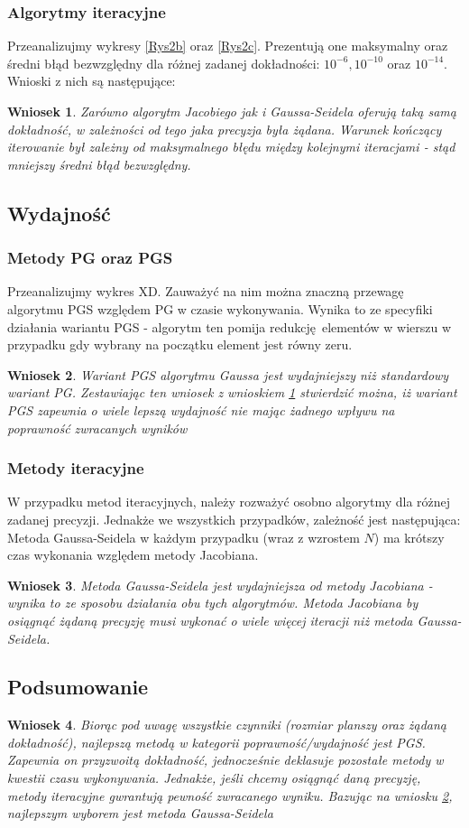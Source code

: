 \documentclass[10pt]{article}
\newtheorem{wn}{Wniosek}
\begin{document}
\subsubsection{Algorytmy iteracyjne}
Przeanalizujmy wykresy \ref{Rys2b} oraz \ref{Rys2c}. Prezentują one maksymalny oraz średni błąd bezwzględny dla różnej zadanej dokładności: $10^{-6},10^{-10}$ oraz $10^{-14}$.
Wnioski z nich są następujące:
\begin{wn}
	Zarówno algorytm Jacobiego jak i Gaussa-Seidela oferują taką samą dokładność, w zależności od tego jaka precyzja była żądana. Warunek kończący iterowanie był zależny od maksymalnego błędu między kolejnymi iteracjami - stąd mniejszy średni błąd bezwzględny. \label{wn:3}
\end{wn}
\subsection{Wydajność}
\subsubsection{Metody PG oraz PGS}
Przeanalizujmy wykres XD. Zauważyć na nim można znaczną przewagę algorytmu PGS względem PG w czasie wykonywania. Wynika to ze specyfiki działania wariantu PGS - algorytm ten pomija redukcję elementów w wierszu w przypadku gdy wybrany na początku element jest równy zeru.
\begin{wn}
	Wariant PGS algorytmu Gaussa jest wydajniejszy niż standardowy wariant PG. Zestawiając ten wniosek z wnioskiem \ref{wn:3} stwierdzić można, iż wariant PGS zapewnia o wiele lepszą wydajność nie mając żadnego wpływu na poprawność zwracanych wyników
	 \label{wn:4}
\end{wn}
\subsubsection{Metody iteracyjne}
W przypadku metod iteracyjnych, należy rozważyć osobno algorytmy dla różnej zadanej precyzji.
Jednakże we wszystkich przypadków, zależność jest następująca: Metoda Gaussa-Seidela w każdym przypadku (wraz z wzrostem $N$) ma krótszy czas wykonania względem metody Jacobiana.
\begin{wn}
	Metoda Gaussa-Seidela jest wydajniejsza od metody Jacobiana - wynika to ze sposobu działania obu tych algorytmów. Metoda Jacobiana by osiągnąć żądaną precyzję musi wykonać o wiele więcej iteracji niż metoda Gaussa-Seidela. \label{wn:5}
\end{wn}
\subsection{Podsumowanie}
\begin{wn}
	Biorąc pod uwagę wszystkie czynniki (rozmiar planszy oraz żądaną dokładność), najlepszą metodą w kategorii poprawność/wydajność jest PGS. Zapewnia on przyzwoitą dokładność, jednocześnie deklasuje pozostałe metody w kwestii czasu wykonywania. Jednakże, jeśli chcemy osiągnąć daną precyzję, metody iteracyjne gwrantują pewność zwracanego wyniku. Bazując na wniosku \ref{wn:4}, najlepszym wyborem jest metoda Gaussa-Seidela \label{wn:6}
\end{wn}
\end{document}
